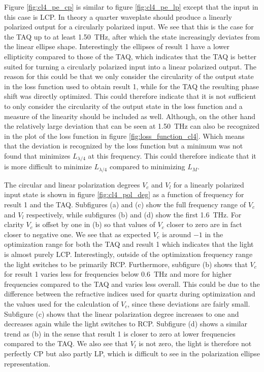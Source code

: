 Figure \ref{fig:cl4_pe_cp} is similar to figure \ref{fig:cl4_pe_lp} except that the input in this case is LCP. In theory a quarter waveplate should produce a linearly polarized output for a circularly polarized input. We see that this is the case for the TAQ up to at least \SI{1.50}{\tera \hertz}, after which the state increasingly deviates from the linear ellipse shape. Interestingly the ellipses of result 1 have a lower ellipticity compared to those of the TAQ, which indicates that the TAQ is better suited for turning a circularly polarized input into a linear polarized output. The reason for this could be that we only consider the circularity of the output state in the loss function used to obtain result 1, while for the TAQ the resulting phase shift was directly optimized. This could therefore indicate that it is not sufficient to only consider the circularity of the output state in the loss function and a measure of the linearity should be included as well. Although, on the other hand the relatively large deviation that can be seen at \SI{1.50}{\tera \hertz} can also be recognized in the plot of the loss function in figure \ref{fig:loss_function_cl4}. Which means that the deviation is recognized by the loss function but a minimum was not found that minimizes $L_{\lambda/4}$ at this frequency. This could therefore indicate that it is more difficult to minimize $L_{\lambda/4}$ compared to minimizing $L_M$.

The circular and linear polarization degrees $V_c$ and $V_l$ for a linearly polarized input state is shown in figure \ref{fig:cl4_pol_deg} as a function of frequency for result 1 and the TAQ. Subfigures (a) and (c) show the full frequency range of $V_c$ and $V_l$ respectively, while subfigures (b) and (d) show the first \SI{1.6}{\tera \hertz}. For clarity $V_c$ is offset by one in (b) so that values of $V_c$ closer to zero are in fact closer to negative one. We see that as expected $V_c$ is around $-1$ in the optimization range for both the TAQ and result 1 which indicates that the light is almost purely LCP. Interestingly, outside of the optimization frequency range the light switches to be primarily RCP. Furthermore, subfigure (b) shows that $V_c$ for result 1 varies less for frequencies below \SI{0.6}{\tera \hertz} and more for higher frequencies compared to the TAQ and varies less overall. This could be due to the difference between the refractive indices used for quartz during optimization and the values used for the calculation of $V_c$, since these deviations are fairly small. Subfigure (c) shows that the linear polarization degree increases to one and decreases again while the light switches to RCP. Subfigure (d) shows a similar trend as (b) in the sense that result 1 is closer to zero at lower frequencies compared to the TAQ. We also see that $V_l$ is not zero, the light is therefore not perfectly CP but also partly LP, which is difficult to see in the polarization ellipse representation. 

